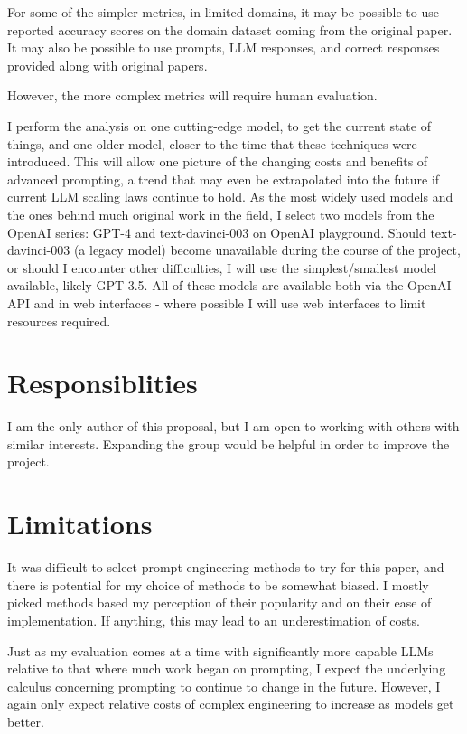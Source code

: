 \documentclass[11pt]{article}
\begin{document}
For some of the simpler metrics, in limited domains, it may be possible to use reported accuracy scores on the domain dataset coming from the original paper. It may also be possible to use prompts, LLM responses, and correct responses provided along with original papers. 

However, the more complex metrics will require human evaluation.

I perform the analysis on one cutting-edge model, to get the current state of things, and one older model, closer to the time that these techniques were introduced. This will allow one picture of the changing costs and benefits of advanced prompting, a trend that may even be extrapolated into the future if current LLM scaling laws continue to hold. As the most widely used models and the ones behind much original work in the field, I select two models from the OpenAI series: GPT-4 and text-davinci-003 on OpenAI playground. Should text-davinci-003 (a legacy model) become unavailable during the course of the project, or should I encounter other difficulties, I will use the simplest/smallest model available, likely GPT-3.5. All of these models are available both via the OpenAI API and in web interfaces - where possible I will use web interfaces to limit resources required.

\section{Responsiblities}

I am the only author of this proposal, but I am open to working with others with similar interests. Expanding the group would be helpful in order to improve the project.

\section*{Limitations}

It was difficult to select prompt engineering methods to try for this paper, and there is potential for my choice of methods to be somewhat biased. I mostly picked methods based my perception of their popularity and on their ease of implementation. If anything, this may lead to an underestimation of costs.

Just as my evaluation comes at a time with significantly more capable LLMs relative to that where much work began on prompting, I expect the underlying calculus concerning prompting to continue to change in the future. However, I again only expect relative costs of complex engineering to increase as models get better.
\end{document}
